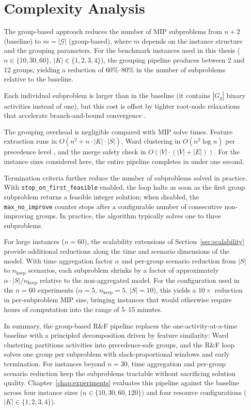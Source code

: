 \section{Complexity Analysis}
\label{sec:grouprf_complexity}
The group-based approach reduces the number of MIP subproblems
from $n+2$ (baseline) to $m = |\mathcal{G}|$ (group-based), where
$m$ depends on the instance structure and the grouping parameters.
For the benchmark instances used in this thesis
($n \in \{10, 30, 60\}$, $|K| \in \{1, 2, 3, 4\}$), the grouping
pipeline produces between 2 and 12 groups, yielding a reduction of
$60\%$--$80\%$ in the number of subproblems relative to the
baseline.

Each individual subproblem is larger than in the baseline (it
contains $|G_g|$ binary activities instead of one), but this cost
is offset by tighter root-node relaxations that accelerate
branch-and-bound convergence \parencite{pochet2006}.

The grouping overhead is negligible compared with MIP solve
times. Feature extraction runs in
$O(n^2 + n \cdot |K| \cdot |S|)$, Ward clustering in
$O(n^2 \log n)$ per precedence level \parencite{Murtagh2012},
and the merge safety check in
$O(|V| \cdot (|V| + |E|))$. For the instance sizes considered
here, the entire pipeline completes in under one second.

Termination criteria further reduce the number of subproblems
solved in practice. With \texttt{stop\_on\_first\_feasible}
enabled, the loop halts as soon as the first group subproblem
returns a feasible integer solution; when disabled, the
\texttt{max\_no\_improve} counter stops after a configurable
number of consecutive non-improving groups. In practice, the
algorithm typically solves one to three subproblems.

For large instances ($n = 60$), the scalability extensions of
Section~\ref{sec:scalability} provide additional reductions along
the time and scenario dimensions of the model. With time
aggregation factor $\alpha$ and per-group scenario reduction from
$|S|$ to $n_{\mathrm{keep}}$ scenarios, each subproblem shrinks
by a factor of approximately
$\alpha \cdot |S|/n_{\mathrm{keep}}$ relative to the
non-aggregated model. For the configuration used in the $n = 60$
experiments ($\alpha = 5$, $n_{\mathrm{keep}} = 5$, $|S| = 10$),
this yields a $10\times$ reduction in per-subproblem MIP size,
bringing instances that would otherwise require hours of
computation into the range of 5--15 minutes.

\bigskip
\noindent
In summary, the group-based R\&F pipeline replaces the
one-activity-at-a-time baseline with a principled decomposition
driven by feature similarity: Ward clustering partitions
activities into precedence-safe groups, and the R\&F loop solves
one group per subproblem with slack-proportional windows and
early termination. For instances beyond $n = 30$, time
aggregation and per-group scenario reduction keep the
subproblems tractable without sacrificing solution quality.
Chapter~\ref{chap:experiments} evaluates this pipeline against
the baseline across four instance sizes
($n \in \{10, 30, 60, 120\}$) and four resource configurations
($|K| \in \{1, 2, 3, 4\}$).
